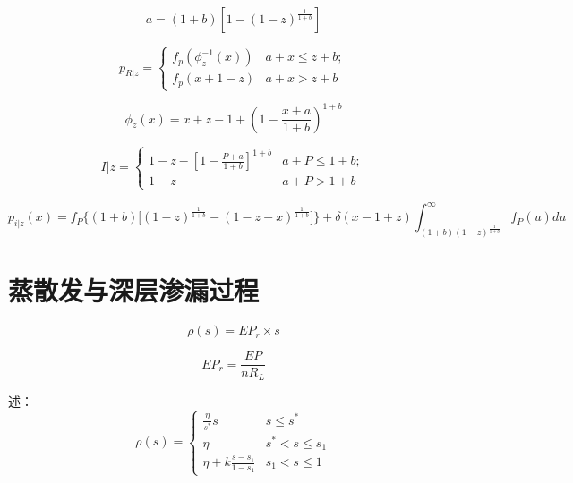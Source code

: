 \documentclass[draft,wrr]{AGUTeX}
\begin{document}
\begin{article}
\begin{equation}
a=(1+b)[1-(1-z)^{\frac{1}{1+b}}]
\end{equation}
 
\begin{equation}
\label{rxaj}
p_{R|z}=
 \begin{cases}
 f_p(\phi_z^{-1}(x))&{a+x \leq z+b};\\f_p(x+1-z) &{a+x> z+b}
 \end{cases}
\end{equation}
 
\begin{equation}
\phi_z(x)=x+z-1+(1-\frac{x+a}{1+b})^{1+b}
\end{equation}
 
\begin{equation}
I\vert z=
 \begin{cases}
 1-z-[1-\frac{P+a}{1+b}]^{1+b}&{a+P\leq 1+b};\\1-z &{a+P> 1+b}
 \end{cases}
\end{equation}
 
\begin{equation}
\label{xaj}
p_{i|z}(x)=f_P\bigg \{(1+b)\big [(1-z)^{\frac{1}{1+b}}-(1-z-x)^{\frac{1}{1+b}}\big ]\bigg \}+\delta(x-1+z)\int_{(1+b)(1-z)^{\frac{1}{1+b}}}^{\infty} f_P(u) du 
\end{equation}

 
 

 

\section{蒸散发与深层渗漏过程}
 
\begin{equation}
\label{linearep}
\rho (s)=EP_r \times s
\end{equation}
 
\begin{equation}
\label{rree}
EP_r=\frac{EP}{nR_L}
\end{equation}

 述\cite{eagleson2011land}：
 \begin{equation}
\rho (s)=
 \begin{cases}
 \frac{\eta}{s^*} s  &s\leq s^{*}\\ 
 \eta &s^*<s\leq s_1\\
 \eta+k\frac{s-s_1}{1-s_1} &s_1<s\leq 1
 \end{cases}
 \end{equation} 
 

\end{article}
\end{document}
